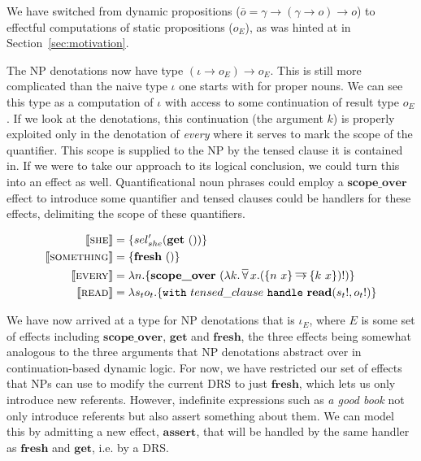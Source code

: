 \documentclass{article}
\newcommand{\dimpl}{\mathbin{\overline{\to}}}
\newcommand{\dforall}{\mathop{\overline{\forall}}}
\newcommand{\sem}[1]{\llbracket #1 \rrbracket}
\newcommand{\keyword}[1]{\texttt{#1}}
\newcommand{\effect}[1]{\textbf{#1}}
\newcommand{\semdom}[1]{\textbf{#1}}
\newcommand{\handle}[2]{\keyword{with}\ #1\ \keyword{handle}\ #2}
\begin{document}
We have switched from dynamic propositions ($\overline{o} = \gamma \to (\gamma
\to o) \to o$) to effectful computations of static propositions ($o_E$), as
was hinted at in Section~\ref{sec:motivation}.

The NP denotations now have type $(\iota \to o_E) \to o_E$. This is still more
complicated than the naive type $\iota$ one starts with for proper nouns. We
can see this type as a computation of $\iota$ with access to some continuation
of result type $o_E$. If we look at the denotations, this continuation (the
argument $k$) is properly exploited only in the denotation of \emph{every}
where it serves to mark the scope of the quantifier. This scope is supplied to
the NP by the tensed clause it is contained in. If we were to take our
approach to its logical conclusion, we could turn this into an effect as
well. Quantificational noun phrases could employ a $\effect{scope\_over}$
effect to introduce some quantifier and tensed clauses could be handlers for
these effects, delimiting the scope of these quantifiers.

\vspace{-4mm}

\begin{align*}
  \sem{\textsc{she}} &= \{ sel_{she}' (\effect{get}\ ()) \} \\
  \sem{\textsc{something}} &= \{ \effect{fresh}\ () \} \\
  \sem{\textsc{every}} &= \lambda n. \{ \effect{scope\_over}\ (\lambda
  k. \dforall x. (\{n\ x\} \dimpl \{k\ x\})!) \} \\
  \sem{\textsc{read}} &= \lambda s_t o_t. \{ \handle{tensed\_clause}{\semdom{read}(s_t!, o_t!)} \}
\end{align*}

We have now arrived at a type for NP denotations that is $\iota_E$, where $E$
is some set of effects including $\effect{scope\_over}$, $\effect{get}$ and
$\effect{fresh}$, the three effects being somewhat analogous to the three
arguments that NP denotations abstract over in continuation-based dynamic
logic. For now, we have restricted our set of effects that NPs can use to
modify the current DRS to just $\effect{fresh}$, which lets us only introduce
new referents. However, indefinite expressions such as \emph{a good book} not
only introduce referents but also assert something about them. We can model
this by admitting a new effect, $\effect{assert}$, that will be handled by the
same handler as $\effect{fresh}$ and $\effect{get}$, i.e. by a DRS.
\end{document}
